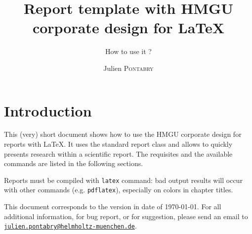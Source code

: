 \documentclass[a4paper,12pt,oneside]{report}
\title{Report template with HMGU corporate design for \LaTeX{}}
\subtitle{How to use it ?}
\author{Julien \textsc{Pontabry}}
\institute{Institute for Epigenetics and Stem Cells}
\begin{document}
	\maketitle

	\chapter{Introduction}
		This (very) short document shows how to use the HMGU corporate design for reports with \LaTeX{}. It uses the standard report class and allows to quickly presents research within a scientific report. The requisites and the available commands are listed in the following sections.
		
		Reports must be compiled with \texttt{latex} command: bad output results will occur with other commands (e.g. \texttt{pdflatex}), especially on colors in chapter titles.
		
		This document corresponds to the version in date of \today. For all additional information, for bug report, or for suggestion, please send an email to \texttt{\url{julien.pontabry@helmholtz-muenchen.de}}.
	
\end{document}
